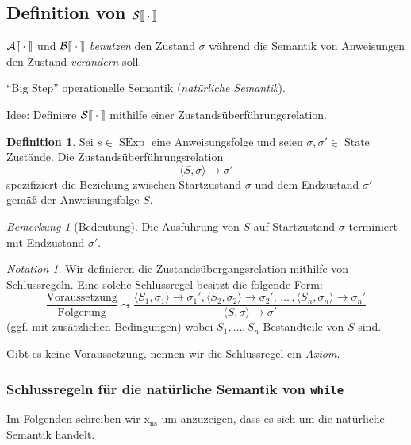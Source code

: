 \documentclass[a4paper,12pt]{article}
\theoremstyle{definition}
\newtheorem{definition}{Definition}[section]
\theoremstyle{plain}
\theoremstyle{remark}
\newtheorem*{remark}{Bemerkung}
\newtheorem*{notation}{Notation}
\newcommand{\lsem}{\mathrm{[}\kern-.14em\mathrm{[}}
\newcommand{\rsem}{\mathrm{]}\kern-.14em\mathrm{]}}
\newcommand{\Bsem}[1]{\mathcal{B}\lsem#1\rsem}
\newcommand{\Asem}[1]{\mathcal{A}\lsem#1\rsem}
\newcommand{\Ssem}[1]{\mathcal{S}\lsem#1\rsem}
\newcommand{\strans}[3]{\langle #1, #2 \rangle \to #3}
\DeclareMathOperator{\SExp}{SExp}
\DeclareMathOperator{\State}{State}
\begin{document}
\subsection{Definition von \texorpdfstring{$\mathcal{S}\lsem \cdot \rsem$}{S[.]}}

$\Asem{\cdot}$ und $\Bsem{\cdot}$ \emph{benutzen} den Zustand $\sigma$ während die Semantik von Anweisungen den Zustand \emph{verändern} soll.

``Big Step'' operationelle Semantik (\emph{natürliche Semantik}).

Idee: Definiere $\Ssem{\cdot}$ mithilfe einer Zustandsüberführungerelation.

\begin{definition}
    Sei $s \in \SExp$ eine Anweisungsfolge und seien $\sigma, \sigma' \in \State$ Zustände. Die Zustandsüberführungsrelation
    $$\strans{S}{\sigma}{\sigma'}$$
    spezifiziert die Beziehung zwischen Startzustand $\sigma$ und dem Endzustand $\sigma'$ gemäß der Anweisungsfolge $S$.
\end{definition}

\begin{remark}[Bedeutung]
    Die Ausführung von $S$ auf Startzustand $\sigma$ terminiert mit Endzustand $\sigma'$.
\end{remark}

\par\medskip
\begin{notation}
    Wir definieren die Zustandsübergangsrelation mithilfe von Schlussregeln. Eine solche Schlussregel besitzt die folgende Form:
    $$\frac{\text{Voraussetzung}}{\text{Folgerung}} \leadsto \frac{\strans{S_1}{\sigma_1}{\sigma_1'}, \strans{S_2}{\sigma_2}{\sigma_2'}, \,\dots\, , \strans{S_n}{\sigma_n}{\sigma_n'}}{\strans{S}{\sigma}{\sigma'}}$$
    (ggf. mit zusätzlichen Bedingungen) wobei $S_1, \dots, S_n$ Bestandteile von $S$ sind.

    Gibt es keine Voraussetzung, nennen wir die Schlussregel ein \emph{Axiom}.
\end{notation}



\subsubsection{Schlussregeln für die natürliche Semantik von \texttt{while}}

Im Folgenden schreiben wir x$_{\text{ns}}$ um anzuzeigen, dass es sich um die natürliche Semantik handelt.
\end{document}
